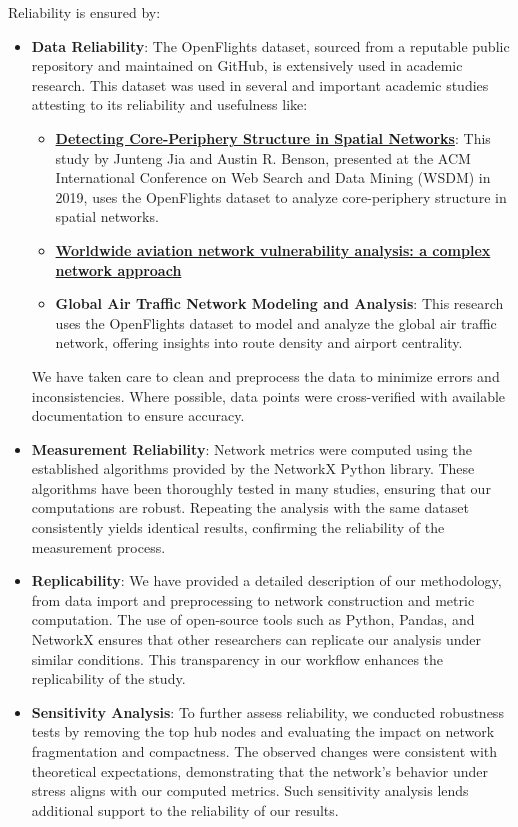 \documentclass[12pt]{article}
\begin{document}
    Reliability is ensured by:
    \begin{itemize}
        \item \textbf{Data Reliability}: The OpenFlights dataset, sourced from a reputable public repository and maintained on GitHub, is extensively used in academic research.
        This dataset was used in several and important academic studies attesting to its reliability and usefulness like:
            \begin{itemize}
                \item \textbf{\href{ https://www.nature.com/articles/srep01467}{Detecting Core-Periphery Structure in Spatial Networks}}: This study by Junteng Jia and Austin R. Benson, presented at the ACM International Conference on Web Search and Data Mining (WSDM) in 2019, uses the OpenFlights dataset to analyze core-periphery structure in spatial networks.
                \item \textbf{\href{https://www.researchgate.net/publication/289685187_Worldwide_aviation_network_vulnerability_analysis_a_complex_network_approach}{Worldwide aviation network vulnerability analysis: a complex network approach}}
                \item \textbf{Global Air Traffic Network Modeling and Analysis}:  This research uses the OpenFlights dataset to model and analyze the global air traffic network, offering insights into route density and airport centrality.
            \end{itemize}
        We have taken care to clean and preprocess the data to minimize errors and inconsistencies. Where possible, data points were cross-verified with available documentation to ensure accuracy.

        \item \textbf{Measurement Reliability}: Network metrics were computed using the established algorithms provided by the NetworkX Python library. These algorithms have been thoroughly tested in many studies, ensuring that our computations are robust. Repeating the analysis with the same dataset consistently yields identical results, confirming the reliability of the measurement process.

        \item \textbf{Replicability}: We have provided a detailed description of our methodology, from data import and preprocessing to network construction and metric computation. The use of open-source tools such as Python, Pandas, and NetworkX ensures that other researchers can replicate our analysis under similar conditions. This transparency in our workflow enhances the replicability of the study.

        \item \textbf{Sensitivity Analysis}: To further assess reliability, we conducted robustness tests by removing the top hub nodes and evaluating the impact on network fragmentation and compactness.
        The observed changes were consistent with theoretical expectations, demonstrating that the network's behavior under stress aligns with our computed metrics.
        Such sensitivity analysis lends additional support to the reliability of our results.

    \end{itemize}
\end{document}
